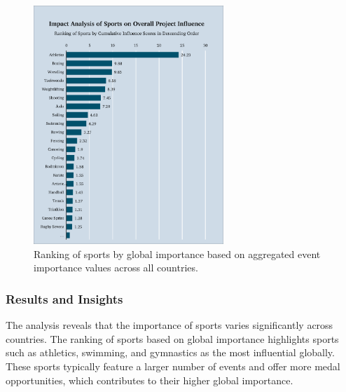 \documentclass{mcmthesis}
\begin{document}
\begin{figure}  %
    \centering
    \includegraphics[width=0.9\linewidth,height=9cm]{pics/sport_influence_whole.png}
    \caption{Ranking of sports by global importance based on aggregated event importance values across all countries.}
    \label{fig:sport_importance}
\end{figure}


\subsubsection{Results and Insights}
The analysis reveals that the importance of sports varies significantly across countries. The ranking of sports based on global importance highlights sports such as athletics, swimming, and gymnastics as the most influential globally. These sports typically feature a larger number of events and offer more medal opportunities, which contributes to their higher global importance.

\end{document}
